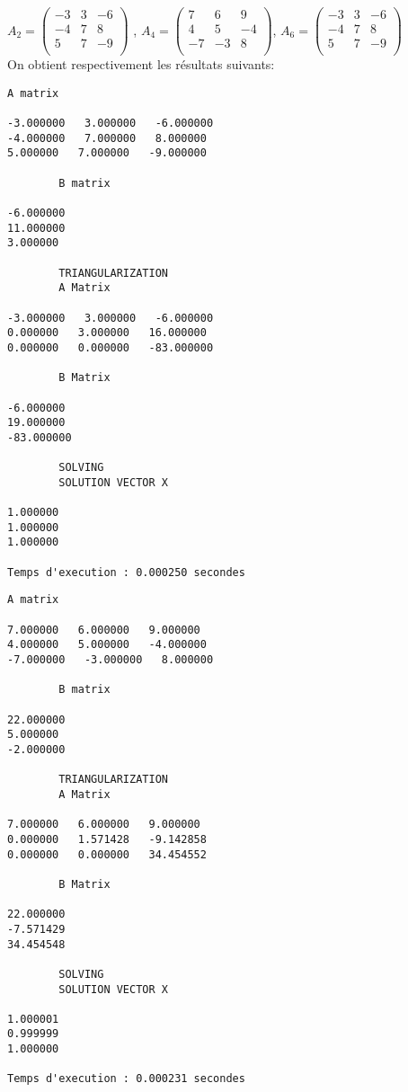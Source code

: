 $A_2 = \begin{pmatrix}
-3 & 3 & -6 \\
-4 & 7 &  8 \\
5 & 7 & -9 \\
\end{pmatrix}
$
,
$A_4 = \begin{pmatrix}
7 & 6 & 9 \\
4 & 5 &  -4\\
-7 & -3 & 8 \\
\end{pmatrix}
$,
$A_6 = \begin{pmatrix}
-3 & 3 & -6 \\
-4 & 7 &  8 \\
5 & 7 & -9 \\
\end{pmatrix}
$
\vspace{12pt}\\
On obtient respectivement les résultats suivants:
\\
\begin{lstlisting}[caption={$A_2X=B$} results, basicstyle=\fontsize{4}{6}\selectfont]
  		A matrix 

-3.000000   3.000000   -6.000000   
-4.000000   7.000000   8.000000   
5.000000   7.000000   -9.000000   

		B matrix 

-6.000000   
11.000000   
3.000000   

		TRIANGULARIZATION
		A Matrix 

-3.000000   3.000000   -6.000000   
0.000000   3.000000   16.000000   
0.000000   0.000000   -83.000000   

		B Matrix 

-6.000000   
19.000000   
-83.000000   

		SOLVING 
		SOLUTION VECTOR X 

1.000000   
1.000000   
1.000000   

Temps d'execution : 0.000250 secondes
\end{lstlisting}
\begin{lstlisting}[caption={$A_4X=B$} results, basicstyle=\fontsize{4}{6}\selectfont]
		A matrix 

7.000000   6.000000   9.000000   
4.000000   5.000000   -4.000000   
-7.000000   -3.000000   8.000000   

		B matrix 

22.000000   
5.000000   
-2.000000   

		TRIANGULARIZATION 
		A Matrix 

7.000000   6.000000   9.000000   
0.000000   1.571428   -9.142858   
0.000000   0.000000   34.454552   

		B Matrix 

22.000000   
-7.571429   
34.454548   

		SOLVING 
		SOLUTION VECTOR X 

1.000001   
0.999999   
1.000000   

Temps d'execution : 0.000231 secondes
\end{lstlisting}
